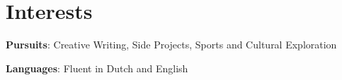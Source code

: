 \section{Interests}
 \resumeSubHeadingListStart
   \item{
     \textbf{Pursuits}{: Creative Writing, Side Projects, Sports and Cultural Exploration}
   }
   \item{
     \textbf{Languages}{: Fluent in Dutch and English}
   }
 \resumeSubHeadingListEnd
